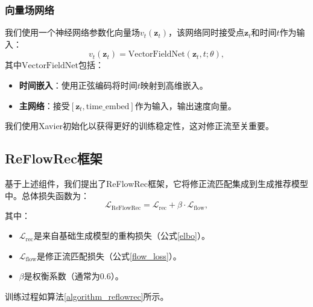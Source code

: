 \documentclass[sigconf]{acmart}
\begin{document}
\subsubsection{\textbf{向量场网络}}
我们使用一个神经网络参数化向量场$v_t(\mathbf z_t)$，该网络同时接受点$\mathbf z_t$和时间$t$作为输入：
\begin{equation}
\label{vector_field}
v_t(\mathbf z_t) = \text{VectorFieldNet}(\mathbf z_t, t; \theta),
\end{equation}
其中$\text{VectorFieldNet}$包括：
\begin{itemize}[leftmargin=*]
\item \textbf{时间嵌入}：使用正弦编码将时间$t$映射到高维嵌入。
\item \textbf{主网络}：接受$[\mathbf z_t, \text{time\_embed}]$作为输入，输出速度向量。
\end{itemize}

我们使用Xavier初始化\cite{glorot2010understanding}以获得更好的训练稳定性，这对修正流至关重要。

\subsection{ReFlowRec框架}
基于上述组件，我们提出了\textsf{ReFlowRec}框架，它将修正流匹配集成到生成推荐模型中。总体损失函数为：
\begin{equation}
\label{reflowrec_loss}
\mathcal L_{\text{ReFlowRec}} = \mathcal L_{\text{rec}} + \beta \cdot \mathcal L_{\text{flow}},
\end{equation}
其中：
\begin{itemize}[leftmargin=*]
\item $\mathcal L_{\text{rec}}$是来自基础生成模型的重构损失（公式\ref{elbo}）。
\item $\mathcal L_{\text{flow}}$是修正流匹配损失（公式\ref{flow_loss}）。
\item $\beta$是权衡系数（通常为0.6）。
\end{itemize}

训练过程如算法\ref{algorithm_reflowrec}所示。
\end{document}
